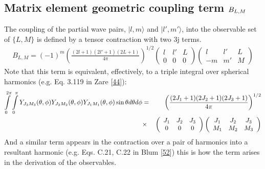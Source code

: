 \documentclass[letterpaper,table,10pt,english]{jupyterBook}
\begin{document}
\subsection{Matrix element geometric coupling term \protect\(B_{L,M}\protect\)}
\label{\detokenize{part1/theory_tensor_formalism_201122:matrix-element-geometric-coupling-term-b-l-m}}\label{\detokenize{part1/theory_tensor_formalism_201122:sec-theory-blm-term}}
\sphinxAtStartPar
The coupling of the partial wave pairs, \(|l,m\rangle\) and \(|l',m'\rangle\), into the observable set of \(\{L,M\}\) is defined by a tensor contraction with two 3j terms.
\begin{equation}\label{equation:part1/theory_tensor_formalism_201122:eq:basis-BLM-defn}
\begin{split}
B_{L,M}=(-1)^{m}\left(\frac{(2l+1)(2l'+1)(2L+1)}{4\pi}\right)^{1/2}\left(\begin{array}{ccc}
l & l' & L\\
0 & 0 & 0
\end{array}\right)\left(\begin{array}{ccc}
l & l' & L\\
-m & m' & M
\end{array}\right)
\end{split}
\end{equation}
\sphinxAtStartPar
Note that this term is equivalent, effectively, to a triple integral over spherical harmonics (e.g. Eq. 3.119 in Zare {[}\hyperlink{cite.backmatter/bibliography:id824}{44}{]}):
\begin{equation*}
\begin{split}
\begin{aligned}
\intop_{0}^{2\pi}\intop_{0}^{\pi}Y_{J_{3}M_{3}}(\theta,\phi)Y_{J_{2}M_{2}}(\theta,\phi)Y_{J_{1}M_{1}}(\theta,\phi)\sin\theta d\theta d\phi & = & \left(\frac{(2J_{1}+1)(2J_{2}+1)(2J_{3}+1)}{4\pi}\right)^{1/2}\\
 & \times & \left(\begin{array}{ccc}
J_{1} & J_{2} & J_{3}\\
0 & 0 & 0
\end{array}\right)\left(\begin{array}{ccc}
J_{1} & J_{2} & J_{3}\\
M_{1} & M_{2} & M_{3}
\end{array}\right)
\end{aligned}
\end{split}
\end{equation*}
\sphinxAtStartPar
And a similar term appears in the contraction over a pair of harmonics into a resultant harmonic (e.g. Eqs. C.21, C.22 in Blum {[}\hyperlink{cite.backmatter/bibliography:id444}{52}{]}) \sphinxhyphen{} this is how the term arises in the derivation of the observables.
\end{document}
